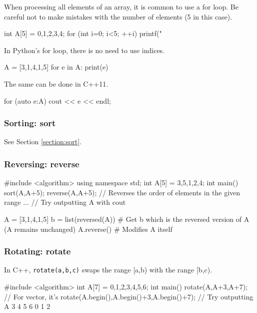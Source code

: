 When processing all elements of an array, it is common to use a for loop. Be careful not to make mistakes with the number of elements (5 in this case).
\begin{cbox}[emph={5}]
int A[5] = {0,1,2,3,4};
for (int i=0; i<5; ++i)
  printf("
\end{cbox}

In Python's for loop, there is no need to use indices.
\begin{pybox}
A = [3,1,4,1,5]
for e in A:
  print(e)
\end{pybox}

The same can be done in C++11.
\begin{c11box}[emph={auto}]
for (auto e:A) cout << e << endl;  
\end{c11box}


\subsubsection{Sorting: sort}

See Section \ref{section:sort}.

\subsubsection{Reversing: reverse}

\begin{cbox}
#include <algorithm>
using namespace std;
int A[5] = {3,5,1,2,4};
int main() {
   sort(A,A+5);
   reverse(A,A+5); // Reverses the order of elements in the given range
   ...  // Try outputting A with cout
}
\end{cbox}

\begin{pybox}
A = [3,1,4,1,5]
b = list(reversed(A)) # Get b which is the reversed version of A (A remains unchanged)
A.reverse()   # Modifies A itself
\end{pybox}

\subsubsection{Rotating: rotate}

In C++, \texttt{rotate(a,b,c)} swaps the range [a,b) with the range [b,c).
\begin{cbox}
#include <algorithm>
int A[7] = {0,1,2,3,4,5,6};
int main() {
  rotate(A,A+3,A+7);
  // For vector, it's rotate(A.begin(),A.begin()+3,A.begin()+7);
  // Try outputting A \dingright{} 3 4 5 6 0 1 2
}
\end{cbox}

